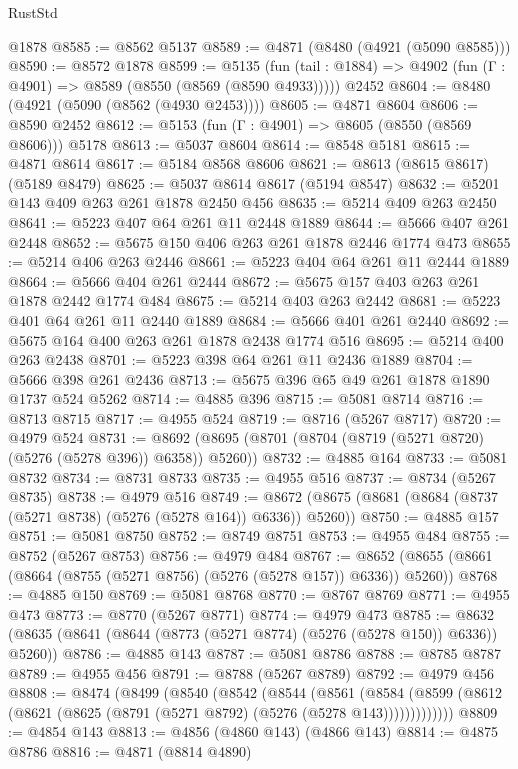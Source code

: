 \begin{lexlean}{RustStd}
\begin{coremodule}
{\begin{coremodule}
{{{{{{{{{{{{{{{{{{{{{{{{{{{{{    @1878
@8585 := @8562 @5137
@8589 := @4871 (@8480 (@4921 (@5090 @8585)))
@8590 := @8572 @1878
@8599 := @5135
    (fun (tail : @1884) => @4902 (fun (Γ : @4901) => @8589 (@8550 (@8569 (@8590 @4933)))))
    @2452
@8604 := @8480 (@4921 (@5090 (@8562 (@4930 @2453))))
@8605 := @4871 @8604
@8606 := @8590 @2452
@8612 := @5153 (fun (Γ : @4901) => @8605 (@8550 (@8569 @8606))) @5178
@8613 := @5037 @8604
@8614 := @8548 @5181
@8615 := @4871 @8614
@8617 := @5184 @8568 @8606
@8621 := @8613 (@8615 @8617) (@5189 @8479)
@8625 := @5037 @8614 @8617 (@5194 @8547)
@8632 := @5201 @143 @409 @263 @261 @1878 @2450 @456
@8635 := @5214 @409 @263 @2450
@8641 := @5223 @407 @64 @261 @11 @2448 @1889
@8644 := @5666 @407 @261 @2448
@8652 := @5675 @150 @406 @263 @261 @1878 @2446 @1774 @473
@8655 := @5214 @406 @263 @2446
@8661 := @5223 @404 @64 @261 @11 @2444 @1889
@8664 := @5666 @404 @261 @2444
@8672 := @5675 @157 @403 @263 @261 @1878 @2442 @1774 @484
@8675 := @5214 @403 @263 @2442
@8681 := @5223 @401 @64 @261 @11 @2440 @1889
@8684 := @5666 @401 @261 @2440
@8692 := @5675 @164 @400 @263 @261 @1878 @2438 @1774 @516
@8695 := @5214 @400 @263 @2438
@8701 := @5223 @398 @64 @261 @11 @2436 @1889
@8704 := @5666 @398 @261 @2436
@8713 := @5675 @396 @65 @49 @261 @1878 @1890 @1737 @524 @5262
@8714 := @4885 @396
@8715 := @5081 @8714
@8716 := @8713 @8715
@8717 := @4955 @524
@8719 := @8716 (@5267 @8717)
@8720 := @4979 @524
@8731 := @8692 (@8695 (@8701 (@8704 (@8719 (@5271 @8720) (@5276 (@5278 @396)) @6358)) @5260))
@8732 := @4885 @164
@8733 := @5081 @8732
@8734 := @8731 @8733
@8735 := @4955 @516
@8737 := @8734 (@5267 @8735)
@8738 := @4979 @516
@8749 := @8672 (@8675 (@8681 (@8684 (@8737 (@5271 @8738) (@5276 (@5278 @164)) @6336)) @5260))
@8750 := @4885 @157
@8751 := @5081 @8750
@8752 := @8749 @8751
@8753 := @4955 @484
@8755 := @8752 (@5267 @8753)
@8756 := @4979 @484
@8767 := @8652 (@8655 (@8661 (@8664 (@8755 (@5271 @8756) (@5276 (@5278 @157)) @6336)) @5260))
@8768 := @4885 @150
@8769 := @5081 @8768
@8770 := @8767 @8769
@8771 := @4955 @473
@8773 := @8770 (@5267 @8771)
@8774 := @4979 @473
@8785 := @8632 (@8635 (@8641 (@8644 (@8773 (@5271 @8774) (@5276 (@5278 @150)) @6336)) @5260))
@8786 := @4885 @143
@8787 := @5081 @8786
@8788 := @8785 @8787
@8789 := @4955 @456
@8791 := @8788 (@5267 @8789)
@8792 := @4979 @456
@8808 := @8474
    (@8499
      (@8540
        (@8542
          (@8544
            (@8561
              (@8584
                (@8599 (@8612 (@8621 (@8625 (@8791 (@5271 @8792) (@5276 (@5278 @143)))))))))))))
@8809 := @4854 @143
@8813 := @4856 (@4860 @143) (@4866 @143)
@8814 := @4875 @8786
@8816 := @4871 (@8814 @4890)
}}}}}}}}}}}}}}}}}}}}}}}}}}}}}
\end{coremodule}}
\end{coremodule}
\end{lexlean}

